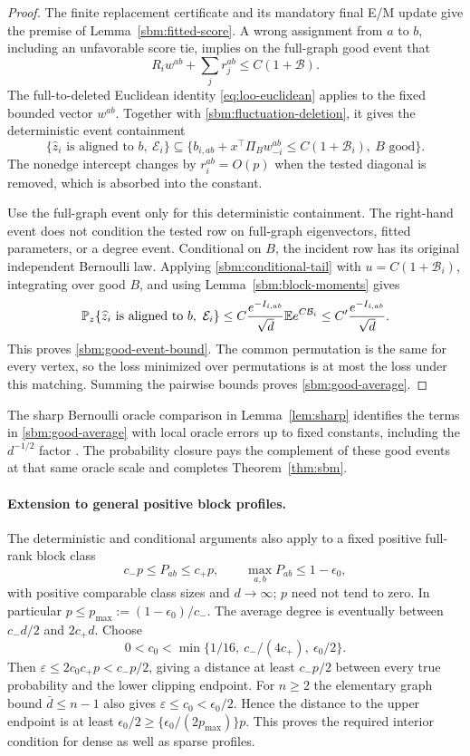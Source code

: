 \begin{proof}
The finite replacement certificate and its mandatory final E/M update
give the premise of Lemma~\ref{sbm:fitted-score}. A wrong assignment
from $a$ to $b$, including an unfavorable score tie, implies on the
full-graph good event that
\[
 R_iw^{ab}+\sum_jr_j^{ab}\le C(1+\mathcal B).
\]
The full-to-deleted Euclidean identity \eqref{eq:loo-euclidean} applies
to the fixed bounded vector $w^{ab}$. Together with
\eqref{sbm:fluctuation-deletion}, it gives the deterministic event
containment
\begin{equation}
 \{\widehat z_i\text{ is aligned to }b,\ \mathcal E_i\}
 \subseteq
 \{b_{i,ab}+x^\top\Pi_Bw_{-i}^{ab}
                \le C(1+\mathcal B_i),\ B\text{ good}\}.
 \label{sbm:event-containment}
\end{equation}
The nonedge intercept changes by $r_i^{ab}=O(p)$ when the tested
diagonal is removed, which is absorbed into the constant.

Use the full-graph event only for this deterministic containment.
The right-hand event does not condition the tested row on full-graph
eigenvectors, fitted parameters, or a degree event. Conditional on
$B$, the incident row has its original independent Bernoulli law.
Applying \eqref{sbm:conditional-tail} with
$u=C(1+\mathcal B_i)$, integrating over good $B$, and using
Lemma~\ref{sbm:block-moments} gives
\[
 \PP_z\{\widehat z_i\text{ is aligned to }b,\ \mathcal E_i\}
 \le C\frac{e^{-I_{i,ab}}}{\sqrt d}
       \E e^{C\mathcal B_i}
 \le C'\frac{e^{-I_{i,ab}}}{\sqrt d}.
\]
This proves \eqref{sbm:good-event-bound}. The common permutation is
the same for every vertex, so the loss minimized over permutations
is at most the loss under this matching. Summing the pairwise bounds
proves \eqref{sbm:good-average}.
\end{proof}

The sharp Bernoulli oracle comparison in Lemma~\ref{lem:sharp}
identifies the terms in \eqref{sbm:good-average} with local oracle
errors up to fixed constants, including the $d^{-1/2}$ factor
\cite{zhouli}. The probability closure pays the complement of these
good events at that same oracle scale and completes
Theorem~\ref{thm:sbm}.

\paragraph{Extension to general positive block profiles.}
The deterministic and conditional arguments also apply to a fixed
positive full-rank block class
\[
 c_-p\le P_{ab}\le c_+p,\qquad
 \max_{a,b}P_{ab}\le1-\epsilon_0,
\]
with positive comparable class sizes and $d\to\infty$; $p$ need not tend
to zero. In particular $p\le p_{\max}:=(1-\epsilon_0)/c_-$.
The average degree is eventually between $c_-d/2$ and $2c_+d$.
Choose
\[
 0<c_0<\min\{1/16,\ c_-/(4c_+),\ \epsilon_0/2\}.
\]
Then $\varepsilon\le2c_0c_+p<c_-p/2$, giving a distance at least
$c_-p/2$ between every true probability and the lower clipping endpoint.
For $n\ge2$ the elementary graph bound $\bar d\le n-1$ also gives
$\varepsilon\le c_0<\epsilon_0/2$. Hence the distance to the upper
endpoint is at least $\epsilon_0/2\ge
\{\epsilon_0/(2p_{\max})\}p$. This proves the required interior
condition for dense as well as sparse profiles.

